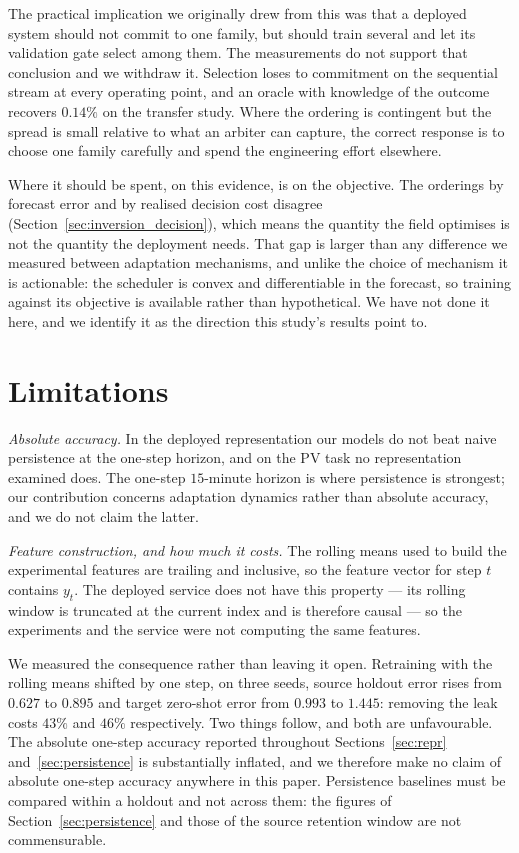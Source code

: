 \documentclass[journal]{IEEEtran}
\begin{document}
The practical implication we originally drew from this was that a deployed
system should not commit to one family, but should train several and let its
validation gate select among them. The measurements do not support that
conclusion and we withdraw it. Selection loses to commitment on the sequential
stream at every operating point, and an oracle with knowledge of the outcome
recovers $0.14\%$ on the transfer study. Where the ordering is contingent but
the spread is small relative to what an arbiter can capture, the correct
response is to choose one family carefully and spend the engineering effort
elsewhere.

Where it should be spent, on this evidence, is on the objective. The orderings
by forecast error and by realised decision cost disagree
(Section~\ref{sec:inversion_decision}), which means the quantity the field
optimises is not the quantity the deployment needs. That gap is larger than any
difference we measured between adaptation mechanisms, and unlike the choice of
mechanism it is actionable: the scheduler is convex and differentiable in the
forecast, so training against its objective is available rather than
hypothetical. We have not done it here, and we identify it as the direction
this study's results point to.

\section{Limitations}
\label{sec:limits}

\emph{Absolute accuracy.} In the deployed representation our models do not beat
naive persistence at the one-step horizon, and on the PV task no representation
examined does. The one-step $15$-minute horizon is where persistence is
strongest; our contribution concerns adaptation dynamics rather than absolute
accuracy, and we do not claim the latter.

\emph{Feature construction, and how much it costs.} The rolling means used to
build the experimental features are trailing and inclusive, so the feature
vector for step $t$ contains $y_t$. The deployed service does not have this
property --- its rolling window is truncated at the current index and is
therefore causal --- so the experiments and the service were not computing the
same features.

We measured the consequence rather than leaving it open. Retraining with the
rolling means shifted by one step, on three seeds, source holdout error rises
from $0.627$ to $0.895$ and target zero-shot error from $0.993$ to $1.445$:
removing the leak costs $43\%$ and $46\%$ respectively. Two things follow, and
both are unfavourable. The absolute one-step accuracy reported throughout
Sections~\ref{sec:repr} and~\ref{sec:persistence} is substantially inflated,
and we therefore make no claim of absolute one-step accuracy anywhere in this
paper. Persistence baselines must be compared within a holdout and not across
them: the figures of Section~\ref{sec:persistence} and those of the source
retention window are not commensurable.
\end{document}
